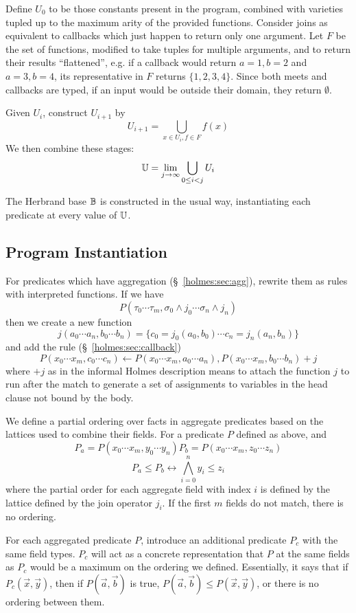 Define $U_0$ to be those constants present in the program, combined with varieties tupled up to the maximum arity of the provided functions.
Consider joins as equivalent to callbacks which just happen to return only one argument.
Let $F$ be the set of functions, modified to take tuples for multiple arguments, and to return their results ``flattened'', e.g. if a callback would return $a = 1, b = 2$ and $a = 3, b = 4$, its representative in $F$ returns $\{1, 2, 3, 4\}$.
Since both meets and callbacks are typed, if an input would be outside their domain, they return $\emptyset$.

Given $U_i$, construct $U_{i + 1}$ by
\[
	U_{i + 1} = \bigcup_{x \in U_i, f \in F} f(x)
\]
We then combine these stages:
\[
	\mathbb{U} = \lim_{j \rightarrow \infty} \bigcup_{0 \leq i < j} U_i
\]

The Herbrand base $\mathbb{B}$ is constructed in the usual way, instantiating each predicate at every value of $\mathbb{U}$.

\subsection{Program Instantiation}
For predicates which have aggregation (\S~\ref{holmes:sec:agg}), rewrite them as rules with interpreted functions.
If we have
\[
	P(\tau_0 \cdots \tau_m, \sigma_0\wedge j_0 \cdots \sigma_n \wedge j_n)
\]
then we create a new function
\[
	j(a_0 \cdots a_n, b_0 \cdots b_n) = \{c_0 = j_0(a_0, b_0) \cdots c_n = j_n(a_n, b_n)\}
\]
and add the rule (\S~\ref{holmes:sec:callback})
\[
	P(x_0 \cdots x_m, c_0 \cdots c_n) \leftarrow P(x_0 \cdots x_m, a_0 \cdots a_n), P(x_0 \cdots x_m, b_0 \cdots b_n) + j
\]
where $+ j$ as in the informal Holmes description means to attach the function $j$ to run after the match to generate a set of assignments to variables in the head clause not bound by the body.

We define a partial ordering over facts in aggregate predicates based on the lattices used to combine their fields.
For a predicate $P$ defined as above, and
\[
	P_a = P(x_0 \cdots x_m, y_0 \cdots y_n)
	P_b = P(x_0 \cdots x_m, z_0 \cdots z_n)
\]
\[
	P_a \leq P_b \leftrightarrow \bigwedge_{i = 0}^n y_i \leq z_i
\]
where the partial order for each aggregate field with index $i$ is defined by the lattice defined by the join operator $j_i$.
If the first $m$ fields do not match, there is no ordering.

For each aggregated predicate $P$, introduce an additional predicate $P_c$ with the same field types.
$P_c$ will act as a concrete representation that $P$ at the same fields as $P_c$ would be a maximum on the ordering we defined.
Essentially, it says that if $P_c(\vec{x}, \vec{y})$, then if $P(\vec{a}, \vec{b})$ is true, $P(\vec{a}, \vec{b}) \leq P(\vec{x}, \vec{y})$, or there is no ordering between them.

